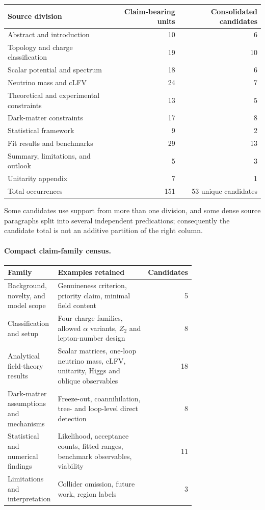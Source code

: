 \begin{center}
\begin{tabular}{lrr}
\hline
Source division & Claim-bearing units & Consolidated candidates \\
\hline
Abstract and introduction & 10 & 6 \\
Topology and charge classification & 19 & 10 \\
Scalar potential and spectrum & 18 & 6 \\
Neutrino mass and cLFV & 24 & 7 \\
Theoretical and experimental constraints & 13 & 5 \\
Dark-matter constraints & 17 & 8 \\
Statistical framework & 9 & 2 \\
Fit results and benchmarks & 29 & 13 \\
Summary, limitations, and outlook & 5 & 3 \\
Unitarity appendix & 7 & 1 \\
\hline
Total occurrences & 151 & 53 unique candidates \\
\hline
\end{tabular}
\end{center}

Some candidates use support from more than one division, and some dense source
paragraphs split into several independent predications; consequently the
candidate total is not an additive partition of the right column.

\paragraph{Compact claim-family census.}
\begin{center}
\begin{tabular}{p{0.23\linewidth}p{0.50\linewidth}r}
\hline
Family & Examples retained & Candidates \\
\hline
Background, novelty, and model scope & Genuineness criterion, priority claim,
minimal field content & 5 \\
Classification and setup & Four charge families, allowed $\alpha$ variants,
$Z_2$ and lepton-number design & 8 \\
Analytical field-theory results & Scalar matrices, one-loop neutrino mass,
cLFV, unitarity, Higgs and oblique observables & 18 \\
Dark-matter assumptions and mechanisms & Freeze-out, coannihilation, tree- and
loop-level direct detection & 8 \\
Statistical and numerical findings & Likelihood, acceptance counts, fitted
ranges, benchmark observables, viability & 11 \\
Limitations and interpretation & Collider omission, future work, region labels
& 3 \\
\hline
\end{tabular}
\end{center}


